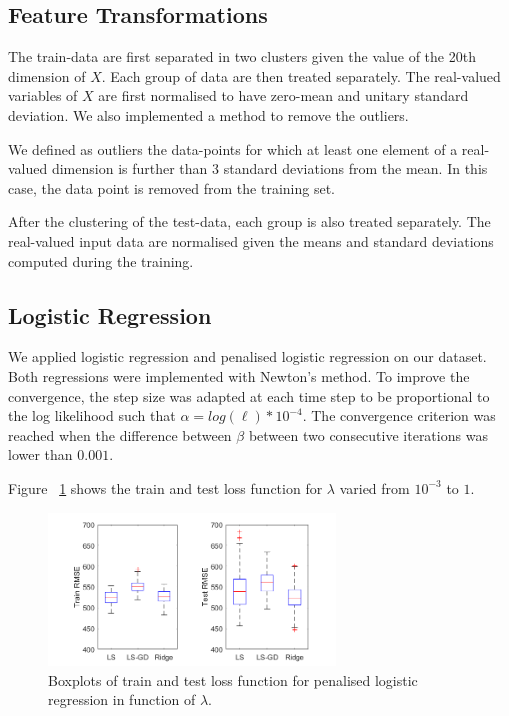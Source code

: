 \documentclass{article} %
\begin{document}
\subsection{Feature Transformations}
The train-data are first separated in two clusters given the value of the 20th dimension of $X$. Each group of data are then treated separately. The real-valued variables of $X$ are first normalised to have zero-mean and unitary standard deviation. We also implemented a method to remove the outliers.

We defined as outliers the data-points for which at least one element of a real-valued dimension is further than 3 standard deviations from the mean. In this case, the data point is removed from the training set. 

After the clustering of the test-data, each group is also treated separately. The real-valued input data are normalised given the means and standard deviations computed during the training.

\subsection{Logistic Regression}
We applied logistic regression and penalised logistic regression on our dataset. Both regressions were implemented with Newton's method. To improve the convergence, the step size was adapted at each time step to be proportional to the log likelihood such that $\alpha = log(\ell) * 10^{-4}$. The convergence criterion was reached when the difference between $\beta$ between two consecutive iterations was lower than $0.001$.

Figure ~\ref{fig:class_penLogistic} shows the train and test loss function for $\lambda$ varied from $10^{-3}$ to $1$.

\begin{figure}[!h] %
	\center
	\includegraphics[width=3in]{figures/comparisonReg.png}
	\caption{Boxplots of train and test loss function for penalised logistic regression in function of $\lambda$.}
	\label{fig:class_penLogistic}
\end{figure}
\end{document}
